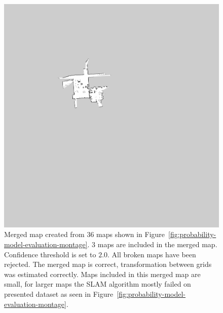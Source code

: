 \begin{figure}
    \centering
    \includegraphics[width=\textwidth]{../img/probability-model-evaluation-treshold_2_0-3maps.png}
    \caption[The merged map created with confidence threshold $2.0$.]{Merged map created from $36$ maps shown in Figure~\ref{fig:probability-model-evaluation-montage}. $3$ maps are included in the merged map. Confidence threshold is set to $2.0$. All broken maps have been rejected. The merged map is correct, transformation between grids was estimated correctly. Maps included in this merged map are small, for larger maps the \gls{SLAM} algorithm mostly failed on presented dataset as seen in Figure~\ref{fig:probability-model-evaluation-montage}.}
    \label{fig:probability-model-evaluation-treshold_2.0-3maps}
\end{figure}

